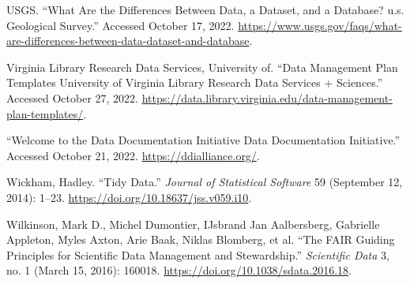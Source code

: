 \documentclass[
]{book}
\newlength{\cslhangindent}
\newlength{\cslentryspacingunit} %
\newenvironment{CSLReferences}[2] %
 {%
  \setlength{\parindent}{0pt}
  \ifodd #1
  \let\oldpar\par
  \def\par{\hangindent=\cslhangindent\oldpar}
  \fi
  \setlength{\parskip}{#2\cslentryspacingunit}
 }%
 {}
\begin{document}
\begin{CSLReferences}{1}{0}
\leavevmode{}%
USGS. {``What Are the Differences Between Data, a Dataset, and a Database? {\textbar} u.s. Geological Survey.''} Accessed October 17, 2022. \url{https://www.usgs.gov/faqs/what-are-differences-between-data-dataset-and-database}.

\leavevmode{}%
Virginia Library Research Data Services, University of. {``Data Management Plan Templates {\textbar} University of Virginia Library Research Data Services + Sciences.''} Accessed October 27, 2022. \url{https://data.library.virginia.edu/data-management-plan-templates/}.

\leavevmode{}%
{``Welcome to the Data Documentation Initiative {\textbar} Data Documentation Initiative.''} Accessed October 21, 2022. \url{https://ddialliance.org/}.

\leavevmode{}%
Wickham, Hadley. {``Tidy Data.''} \emph{Journal of Statistical Software} 59 (September 12, 2014): 1--23. \url{https://doi.org/10.18637/jss.v059.i10}.

\leavevmode{}%
Wilkinson, Mark D., Michel Dumontier, IJsbrand Jan Aalbersberg, Gabrielle Appleton, Myles Axton, Arie Baak, Niklas Blomberg, et al. {``The {FAIR} Guiding Principles for Scientific Data Management and Stewardship.''} \emph{Scientific Data} 3, no. 1 (March 15, 2016): 160018. \url{https://doi.org/10.1038/sdata.2016.18}.

\end{CSLReferences}
\end{document}
